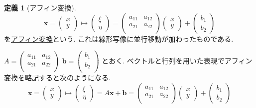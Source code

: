 \documentclass[dvipdfmx,a4paper,11pt]{article}
\theoremstyle{definition}
\newtheorem{dfn}[thm]{定義}
\begin{document}
 \begin{tcolorbox}[
    colback = white,
    colframe = green!35!black,
    fonttitle = \bfseries,
    breakable = true]
    \begin{dfn}[アフィン変換]

$$
\bm{x}
=
\begin{pmatrix}
x \\ y
 \end{pmatrix} 
 \longmapsto  
  \begin{pmatrix}
\xi  \\ \eta
 \end{pmatrix}
  = 
 \begin{pmatrix}
a_{11} &  a_{12} \\ a_{21} & a_{22} \\
 \end{pmatrix}
 \begin{pmatrix}
x \\ y
 \end{pmatrix} 
 +
 \begin{pmatrix}
b_1\\ b_2
 \end{pmatrix} 
$$
を\underline{アフィン変換}という. これは線形写像に並行移動が加わったものである.

$
A=\begin{pmatrix}
a_{11}& a_{12}\\
a_{21}& a_{22} \\
\end{pmatrix}
$
$
\bm{b}=\begin{pmatrix}
b_{1}\\
b_{2} \\
\end{pmatrix}
$
とおく. ベクトルと行列を用いた表現でアフィン変換を略記すると次のようになる.
$$
\bm{x}
=
\begin{pmatrix}
x \\ y
 \end{pmatrix} 
 \longmapsto  
  \begin{pmatrix}
\xi  \\ \eta
 \end{pmatrix}
  =
 A \bm{x}
+ \bm{b}
  = 
 \begin{pmatrix}
a_{11} &  a_{12} \\ a_{21} & a_{22} \\
 \end{pmatrix}
 \begin{pmatrix}
x \\ y
 \end{pmatrix} 
 +
 \begin{pmatrix}
b_1\\ b_2
 \end{pmatrix} 
$$
\end{dfn}
 \end{tcolorbox}
 
\end{document}
